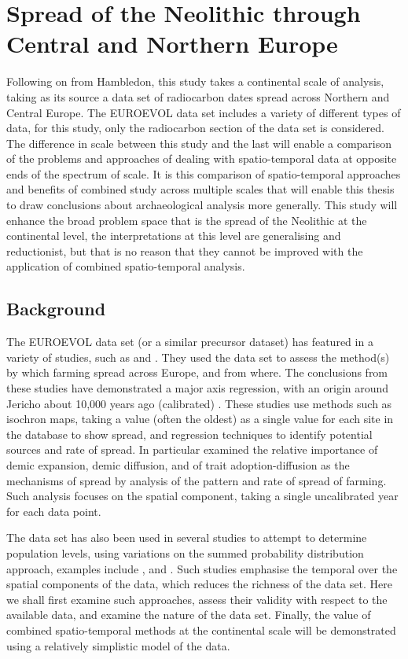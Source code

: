 \chapter{Spread of the Neolithic through Central and Northern Europe} %
\label{ch:summedprob} 
Following on from Hambledon, this study takes a continental scale of analysis, taking as its source a data set of radiocarbon dates spread across Northern and Central Europe. The EUROEVOL data set \citep{Manning:2016fk} includes a variety of different types of data, for this study, only the radiocarbon section of the data set is considered. The difference in scale between this study and the last will enable a comparison of the problems and approaches of dealing with spatio-temporal data at opposite ends of the spectrum of scale. It is this comparison of spatio-temporal approaches and benefits of combined study across multiple scales that will enable this thesis to draw conclusions about archaeological analysis more generally. This study will enhance the broad problem space that is the spread of the Neolithic at the continental level, the interpretations at this level are generalising and reductionist, but that is no reason that they cannot be improved with the application of combined spatio-temporal analysis.

\section{Background}
The EUROEVOL data set \citep{Manning:2016fk} (or a similar precursor dataset) has featured in a variety of studies, such as \citet{gkiasta2003neolithic} and \citet{Russell:2004fk}. They used the data set to assess the method(s) by which farming spread across Europe, and from where. The conclusions from these studies have demonstrated a major axis regression, with an origin around Jericho about 10,000 years ago (calibrated) \citep{gkiasta2003neolithic}. These studies use methods such as isochron maps, taking a value (often the oldest) as a single value for each site in the database to show spread, and regression techniques to identify potential sources and rate of spread. In particular \citet{gkiasta2003neolithic} examined the relative importance of demic expansion, demic diffusion, and of trait adoption-diffusion as the mechanisms of spread by analysis of the pattern and rate of spread of farming. Such analysis focuses on the spatial component, taking a single uncalibrated year for each data point.

The data set has also been used in several studies to attempt to determine population levels, using variations on the summed probability distribution approach, examples include \citet{Shennan:2013fk}, \citet{TIMPSON2014549} and \citet{doi:10.1177/0959683614540952}. Such studies emphasise the temporal over the spatial components of the data, which reduces the richness of the data set. Here we shall first examine such approaches, assess their validity with respect to the available data, and examine the nature of the data set. Finally, the value of combined spatio-temporal methods at the continental scale will be demonstrated using a relatively simplistic model of the data.

